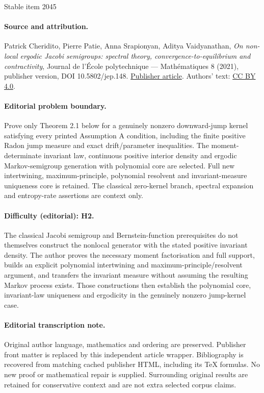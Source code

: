 \documentclass[11pt]{article}
\numberwithin{equation}{section}
\theoremstyle{plain}
\theoremstyle{definition}
\begin{document}
\begin{center}{\Large Stable item 2045}\end{center}
\paragraph{Source and attribution.}
Patrick Cheridito, Pierre Patie, Anna Srapionyan, Aditya Vaidyanathan, \emph{On non-local ergodic Jacobi semigroups: spectral theory, convergence-to-equilibrium and contractivity}, Journal de l’École polytechnique — Mathématiques 8 (2021), publisher version, DOI 10.5802/jep.148. \href{https://jep.centre-mersenne.org/articles/10.5802/jep.148/}{Publisher article}. Authors' text: \href{https://creativecommons.org/licenses/by/4.0/}{CC BY 4.0}.
\paragraph{Editorial problem boundary.}
Prove only Theorem 2.1 below for a genuinely nonzero downward-jump kernel satisfying every printed Assumption A condition, including the finite positive Radon jump measure and exact drift/parameter inequalities. The moment-determinate invariant law, continuous positive interior density and ergodic Markov-semigroup generation with polynomial core are selected. Full new intertwining, maximum-principle, polynomial resolvent and invariant-measure uniqueness core is retained. The classical zero-kernel branch, spectral expansion and entropy-rate assertions are context only.
\paragraph{Difficulty (editorial): H2.}
The classical Jacobi semigroup and Bernstein-function prerequisites do not themselves construct the nonlocal generator with the stated positive invariant density. The author proves the necessary moment factorisation and full support, builds an explicit polynomial intertwining and maximum-principle/resolvent argument, and transfers the invariant measure without assuming the resulting Markov process exists. Those constructions then establish the polynomial core, invariant-law uniqueness and ergodicity in the genuinely nonzero jump-kernel case.
\paragraph{Editorial transcription note.}
Original author language, mathematics and ordering are preserved. Publisher front matter is replaced by this independent article wrapper. Bibliography is recovered from matching cached publisher HTML, including its TeX formulas. No new proof or mathematical repair is supplied. Surrounding original results are retained for conservative context and are not extra selected corpus claims.
\clearpage
\end{document}
